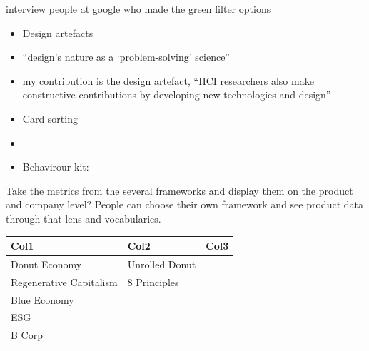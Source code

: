 \documentclass[
  letterpaper,
  DIV=11,
  numbers=noendperiod]{scrartcl}
\begin{document}
interview people at google who made the green filter options

\begin{itemize}
\item
  Design artefacts
\item
  ``design's nature as a `problem-solving' science''
  \citet{oulasvirtaHCIResearchProblemSolving2016}
\item
  my contribution is the design artefact, ``HCI researchers also make
  constructive contributions by developing new technologies and design''
\item
  \citet{affairsCardSorting2013} Card sorting
\item
  \citet{HowModelsWork}
\item
  Behavirour kit:
\end{itemize}

Take the metrics from the several frameworks and display them on the
product and company level? People can choose their own framework and see
product data through that lens and vocabularies.

\begin{longtable}[]{@{}lll@{}}
\toprule\noalign{}
Col1 & Col2 & Col3 \\
\midrule\noalign{}
\endhead
\bottomrule\noalign{}
\endlastfoot
Donut Economy & Unrolled Donut & \\
Regenerative Capitalism & 8 Principles & \\
Blue Economy & & \\
ESG & & \\
B Corp & & \\
\end{longtable}
\end{document}
